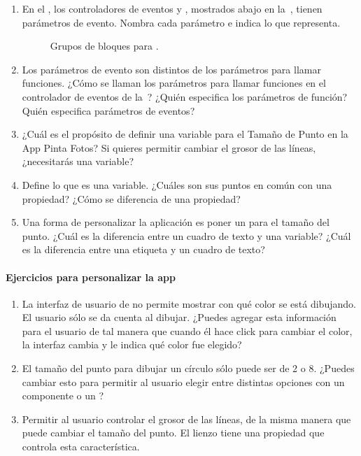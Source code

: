 \begin{enumerate}

\item En el , los controladores de eventos  y
, mostrados abajo en la~,
tienen parámetros de evento. Nombra cada parámetro e indica lo que
representa.

\begin{figure}[H]
\centering
\caption{Grupos de bloques para .}
\label{fig:PaintPot18}
\end{figure}

\item Los parámetros de evento son distintos de los parámetros para llamar
funciones. ¿Cómo se llaman los parámetros para llamar funciones en el
controlador de eventos de la~? ¿Quién especifica
los parámetros de función? Quién especifica parámetros de eventos?

\item ¿Cuál es el propósito de definir una variable para el Tamaño de Punto
en la App Pinta Fotos? Si quieres permitir cambiar el grosor de las
líneas, ¿necesitarás una variable?

\item Define lo que es una variable. ¿Cuáles son sus puntos en común con una
propiedad? ¿Cómo se diferencia de una propiedad?

\item Una forma de personalizar la aplicación es poner un
   para el tamaño del punto. ¿Cuál es la
  diferencia entre un cuadro de texto y una variable? ¿Cuál es la
  diferencia entre una etiqueta y un cuadro de texto?

\end{enumerate}

\paragraph{Ejercicios para personalizar la app}

\begin{enumerate}

\item
  La interfaz de usuario de  no permite mostrar con qué color
  se está dibujando. El usuario sólo se da cuenta al dibujar. ¿Puedes
  agregar esta información para el usuario de tal manera que cuando él
  hace click para cambiar el color, la interfaz cambia y le indica qué
  color fue elegido?

\item
  El tamaño del punto para dibujar un círculo sólo puede ser de 2 o 8.
  ¿Puedes cambiar esto para permitir al usuario elegir entre distintas
  opciones con un componente  o un
  ?

\item Permitir al usuario controlar el grosor de las líneas, de la
  misma manera que puede cambiar el tamaño del punto. El lienzo tiene
  una propiedad  que controla esta
  característica.
\end{enumerate}

